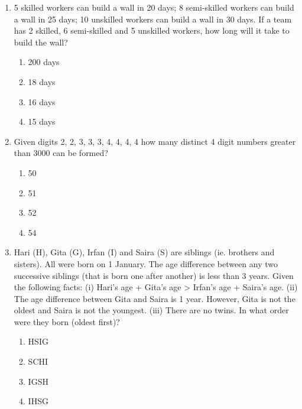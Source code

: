 \documentclass[journal,12pt,onecolumn]{IEEEtran}
\begin{document}
\begin{enumerate}
\item 5 skilled workers can build a wall in 20 days; 8 semi-skilled workers can build a wall in 25 days; 10 unskilled workers can build a wall in 30 days. If a team has 2 skilled, 6 semi-skilled and 5 unskilled workers, how long will it take to build the wall?
\begin{multicols}{2}
\begin{enumerate}
\item 200 days
\item 18 days
\item 16 days
\item 15 days
\end{enumerate}
\end{multicols}

\item Given digits 2, 2, 3, 3, 3, 4, 4, 4, 4 how many distinct 4 digit numbers greater than 3000 can be formed?
\begin{multicols}{2}
\begin{enumerate}
\item 50
\item 51
\item 52
\item 54
\end{enumerate}
\end{multicols}

\item Hari (H), Gita (G), Irfan (I) and Saira (S) are siblings (ie. brothers and sisters). All were born on 1 January. The age difference between any two successive siblings (that is born one after another) is less than 3 years. Given the following facts: (i) Hari's age + Gita's age > Irfan's age + Saira's age. (ii) The age difference between Gita and Saira is 1 year. However, Gita is not the oldest and Saira is not the youngest. (iii) There are no twins. In what order were they born (oldest first)?
\begin{multicols}{2}
\begin{enumerate}
\item HSIG
\item SCHI
\item IGSH
\item IHSG
\end{enumerate}
\end{multicols}

\end{enumerate}
\end{document}
